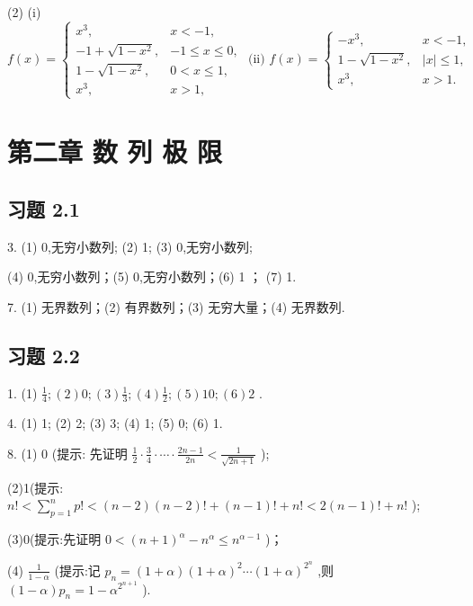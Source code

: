 (2) (i) \(f\left( x\right)  = \left\{  {\begin{array}{ll} {x}^{3}, & x <  - 1, \\   - 1 + \sqrt{1 - {x}^{2}}, &  - 1 \leq  x \leq  0, \\  1 - \sqrt{1 - {x}^{2}}, & 0 < x \leq  1, \\  {x}^{3}, & x > 1, \end{array}\text{ (ii) }f\left( x\right)  = \left\{  \begin{array}{ll}  - {x}^{3}, & x <  - 1, \\  1 - \sqrt{1 - {x}^{2}}, & \left| x\right|  \leq  1, \\  {x}^{3}, & x > 1. \end{array}\right. }\right.\)

\section{第二章 数 列 极 限}

\subsection{习题 2.1}

3. (1) 0,无穷小数列; (2) 1; (3) 0,无穷小数列;

(4) 0,无穷小数列；(5) 0,无穷小数列；(6) 1 ； (7) 1.

7. (1) 无界数列；(2) 有界数列；(3) 无穷大量；(4) 无界数列.

\subsection{习题 2.2}

1. (1) \(\frac{1}{4};\left( 2\right) 0;\left( 3\right) \frac{1}{3};\left( 4\right) \frac{1}{2};\left( 5\right) {10};\left( 6\right) 2\) .

4. (1) 1; (2) 2; (3) 3; (4) 1; (5) 0; (6) 1.

8. (1) 0 (提示: 先证明 \(\frac{1}{2} \cdot  \frac{3}{4} \cdot  \cdots  \cdot  \frac{{2n} - 1}{2n} < \frac{1}{\sqrt{{2n} + 1}}\) );

(2)1(提示: \(n! < \mathop{\sum }\limits_{{p = 1}}^{n}p! < \left( {n - 2}\right) \left( {n - 2}\right) ! + \left( {n - 1}\right) ! + n! < 2\left( {n - 1}\right) ! + n!\) );

(3)0(提示:先证明 \(0 < {\left( n + 1\right) }^{\alpha } - {n}^{\alpha } \leq  {n}^{\alpha  - 1}\) )；

(4) \(\frac{1}{1 - \alpha }\) (提示:记 \({p}_{n} = \left( {1 + \alpha }\right) {\left( 1 + \alpha \right) }^{2}\cdots {\left( 1 + \alpha \right) }^{{2}^{n}}\) ,则 \(\left( {1 - \alpha }\right) {p}_{n} = 1 - {\alpha }^{{2}^{n + 1}}\) ).

